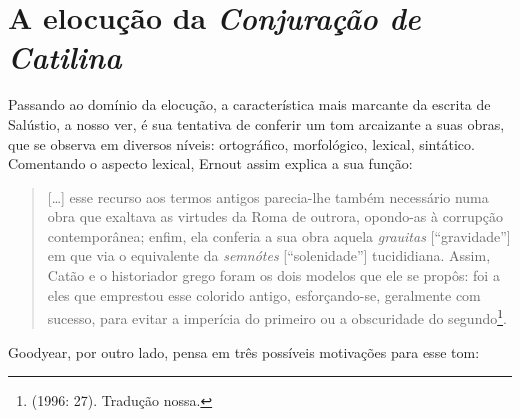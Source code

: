 \section{A elocução da \emph{Conjuração de Catilina}}

 Passando ao domínio da elocução, a característica mais marcante da escrita de
 Salústio, a nosso ver, é sua tentativa de conferir um tom arcaizante a suas
 obras, que se observa em diversos níveis: ortográfico, morfológico, lexical,
 sintático. Comentando o aspecto lexical, Ernout assim explica a sua função: 
 
 
   \begin{quote} [\ldots{}] esse recurso aos termos antigos
   parecia-lhe também necessário numa obra que exaltava as virtudes da Roma de
   outrora, opondo-as à corrupção contemporânea; enfim, ela conferia a sua obra
   aquela \emph{grauitas} [“gravidade”] em que via o equivalente da
   \emph{semnótes} [“solenidade”] tucididiana. Assim, Catão e o historiador
   grego foram os dois modelos que ele se propôs: foi a eles que emprestou esse
   colorido antigo, esforçando-se, geralmente com sucesso, para evitar a
   imperícia do primeiro ou a obscuridade do segundo\footnote{ (1996: 27). Tradução nossa.}.  \end{quote}

Goodyear, por outro lado, pensa em três possíveis motivações para esse tom:

